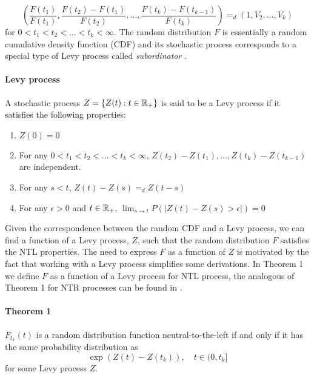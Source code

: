 \begin{equation}\label{increments_NTL_F}
\left(\frac{F(t_1)}{F(t_1)}, \frac{F(t_2) - F(t_1)}{F(t_2)}, \ldots, \frac{F(t_k) - F(t_{k-1})}{F(t_{k})} \right) =_d \left(1, V_2, \ldots, V_k\right)
\end{equation}
for $0 < t_1 < t_2 < \ldots < t_k < \infty$. The random distribution $F$ is essentially a random cumulative density function (CDF) and its stochastic process corresponds to a special type of Levy process called \textit{subordinator} \cite{orbanz2012lecture}. 

\paragraph{Levy process} \cite{papapantoleon2008introduction} A stochastic process $Z = \{Z(t) : t \in \mathbb{R}_+\}$ is said to be a Levy process if it satisfies the following properties:
	\begin{enumerate}
		\item $Z(0) = 0$
		\item For any $0 < t_1 < t_2 < \ldots < t_k < \infty$, $Z(t_2) - Z(t_1), \ldots, Z(t_k) - Z(t_{k-1})$ are independent.
		\item For any $s < t$, $Z(t) - Z(s) =_d Z(t-s)$
		\item For any $\epsilon> 0$ and $t \in \mathbb{R}_{+}$, $\lim_{s \rightarrow t}P( |Z(t)-Z(s) > \epsilon|) = 0$
	\end{enumerate}

Given the correspondence between the random CDF and a Levy process, we can find a function of a Levy process, $Z$, such that the random distribution $F$ satisfies the NTL properties. The need to express $F$ as a function of $Z$ is motivated by the fact that working with a Levy process simplifies some derivations. In Theorem 1 we define $F$ as a function of a Levy process for NTL process, the analogous of Theorem 1 for NTR processes can be found in \cite{doksum1974tailfree}.

\paragraph{Theorem 1} $F_{t_k}(t)$ is a random distribution function neutral-to-the-left if and only if it has the same probability distribution as
\begin{equation}\label{NTL_eq}
\exp(Z(t) - Z(t_k)), \quad t \in (0, t_k]
\end{equation}
for some Levy process $Z$.

